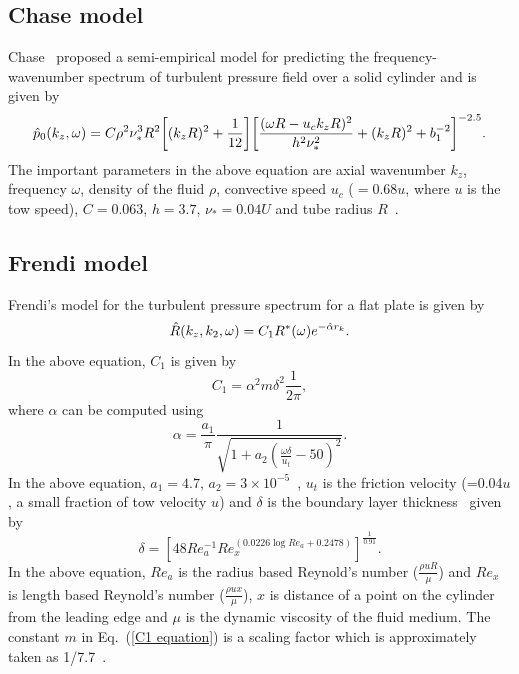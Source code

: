 \documentclass[11pt,cleanfoot]{asme2ej}
\begin{document}
\subsection{Chase model}\label{Chase model}
Chase~\cite{Chase1981} proposed a semi-empirical model for predicting the frequency-wavenumber spectrum of turbulent pressure field over a solid cylinder and is given by
\begin{equation}\label{Turbulent pressure spectrum equation Chase}
        \Hat{p}_{0}(k_{z},\omega) = C\rho^{2}\nu_{*}^{3}R^2\biggl[(k_{z}R)^{2}+\frac{1}{12}\biggr]\biggl[\frac{(\omega R-u_{c}k_{z}R)^{2}}{h^{2}\nu_{*}^{2}}+(k_{z}R)^{2}+b_1^{-2}\biggr]^{-2.5}.
\end{equation}
The important parameters in the above equation are axial wavenumber $k_{z}$, frequency $\omega$, density of the fluid $\rho$, convective speed $u_{c}$ ($=0.68u$, where $u$ is the tow speed), $C=0.063$, $h=3.7$, $\nu_{*}=0.04U$ and tube radius $R$~\cite{Chase1981, carpenter1983, knight1996, KUTTANCHANDRIKA2014, Huang2020}.
\subsection{Frendi model}
\label{Frendi model}
Frendi's model for the turbulent pressure spectrum for a flat plate is given by \cite{frendi2020}
\begin{equation}\label{Pressure spectrum equation from Frendi}
    \Hat{R}(k_{z},k_{2},\omega) = C_{1}R^{*}(\omega)e^{-\Hat{\alpha}r_{k}}.
\end{equation}
In the above equation, $C_{1}$ is given by
\begin{equation}\label{C1 equation}
C_{1} = \alpha^{2}m\delta^{2}\frac{1}{2\pi},   
\end{equation}
where $\alpha$ can be computed using
\begin{equation}\label{alpha equation}
   \alpha = \frac{a_1}{\pi}\frac{1}{\sqrt{1+a_2(\frac{\omega \delta}{u_{t}}-50)^{2}}}.
\end{equation}
In the above equation, $a_1=4.7$, $a_2=3\times10^{-5}$~\cite{frendi2020}, $u_{t}$ is the friction velocity (=0.04$u$, a small fraction of tow velocity $u$) and $\delta$ is the boundary layer thickness~\cite{Jordan2014} given by
\begin{equation}\label{boundary layer thickness}
    \delta = [48Re_a^{-1}Re_x^{(0.0226\log{Re_a}+0.2478)}]^{\frac{1}{0.91}}.
\end{equation}
In the above equation, $Re_a$ is the radius based Reynold's number ($\frac{\rho u R}{\mu}$) and $Re_x$ is length based Reynold's number ($\frac{\rho u x}{\mu}$), $x$ is distance of a point on the cylinder from the leading edge and $\mu$ is the dynamic viscosity of the fluid medium. The constant $m$ in Eq.~(\ref{C1 equation}) is a scaling factor which is approximately taken as 1/7.7~\cite{frendi2020}. 
\end{document}
